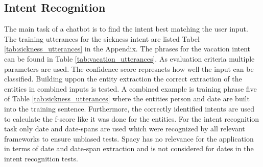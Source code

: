 \subsection*{Intent Recognition}
The main task of a chatbot is to find the intent best matching the user input.
The training utterances for the sickness intent are listed Tabel \ref{tab:sickness_utterances}
in the Appendix.
The phrases for the vacation intent can be found in Table \ref{tab:vacation_utterances}.
As evaluation criteria multiple parameters are used.
The confidence score represnets how well the input can be classified.
Building uppon the entity extraction the correct extraction of the entities in 
combined inputs is tested. 
A combined example is training phrase five of Table \ref{tab:sickness_utterances} 
where the entities person and date are built into the training sentence.
Furthermore, the correctly identified intents are used to calculate the f-score 
like it was done for the entities.
For the intent recognition task only date and date-spans are used which
were recognized by all relevant frameworks to ensure unbiased tests.
Spacy has no relevance for the application in terms of date and date-span
extraction and is not considered for dates in the intent recognition tests.
